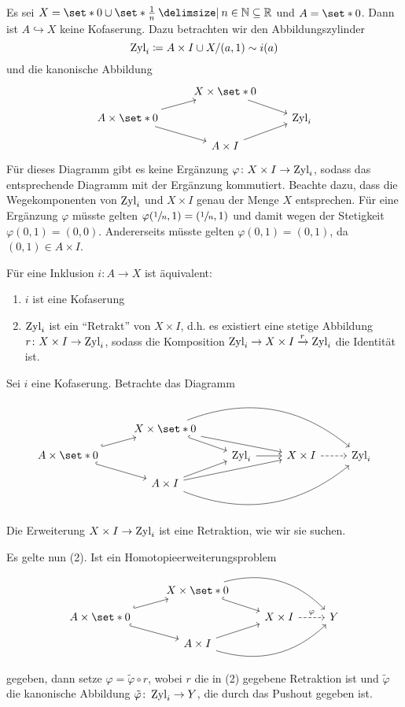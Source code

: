 \begin{beispiel}
	Es sei $X = \set*{0} \cup \set*{\frac{1}{n} \given n \in \mathbb{N}} \subseteq \mathbb{R}$ und $A = \set*{0}$.
	Dann ist $A \hookrightarrow X$ keine Kofaserung.
	Dazu betrachten wir den Abbildungszylinder 
	\[
		\operatorname{Zyl}_i \coloneqq A \times I \cup X / (a,1) \sim i(a)
	\]
	und die kanonische Abbildung
	\[
		\begin{tikzcd}[row sep=small]
			& X \times \set*{0}   \drar \\
			A \times \set*{0} \urar \drar& & \Zyl_i  \\
			& A \times I \urar
		\end{tikzcd}
	\]
	Für dieses Diagramm gibt es keine Ergänzung $\varphi \colon X \times I \to \operatorname{Zyl}_i$, sodass das entsprechende Diagramm mit der Ergänzung kommutiert.
	Beachte dazu, dass die Wegekomponenten von $\operatorname{Zyl}_i$ und $X \times I$ genau der Menge $X$ entsprechen.
	Für eine Ergänzung $\varphi$ müsste gelten $\varphi(\sfrac{1}{n},1) = (\sfrac{1}{n},1)$ und damit wegen der Stetigkeit $\varphi(0,1)=(0,0)$.
	Andererseits müsste gelten $\varphi(0,1) = (0,1)$, da $(0,1) \in A \times I$.
\end{beispiel}

\begin{satz}
	Für eine Inklusion $i \colon A \to X$ ist äquivalent:
	\begin{enumerate}[(1)]
		\item $i$ ist eine Kofaserung
		\item $\operatorname{Zyl}_i$ ist ein \enquote{Retrakt} von $X \times I$, d.h. es existiert eine stetige Abbildung $r \colon X \times I \to \operatorname{Zyl}_i$, sodass die Komposition $\operatorname{Zyl}_i \to X \times I \xrightarrow{r} \operatorname{Zyl}_i$ die Identität ist.
	\end{enumerate}
\end{satz}
\begin{beweis}
	Sei $i$ eine Kofaserung.
	Betrachte das Diagramm
	\[
		\begin{tikzcd}[row sep=small]
			& X \times \set*{0}  \drar[hook] \ar[rrd] \ar[rrrd,bend left] \\
			A \times \set*{0} \urar[hook] \drar[hook] & & \Zyl_i \rar & X \times I \rar[dashed] & \Zyl_i  \\
			& A \times I \urar \ar[urr] \ar[urrr,bend right]
		\end{tikzcd}
	\]
	Die Erweiterung $X \times I \to \operatorname{Zyl}_i$ ist eine Retraktion, wie wir sie suchen.
	
	Es gelte nun (2).
	Ist ein Homotopieerweiterungsproblem
	\[
		\begin{tikzcd}[row sep=small]
			& X \times \set*{0}  \drar[hook] \ar[rrd,bend left] \\
			A \times \set*{0} \urar[hook] \drar[hook] & & X \times I \rar[dashed,"\varphi"] & Y \\
			& A \times I \urar \ar[urr,bend right]
		\end{tikzcd}
	\]
	gegeben, dann setze $\varphi = \tilde{\varphi} \circ r$, wobei $r$ die in (2) gegebene Retraktion ist und $\tilde{\varphi}$ die kanonische Abbildung $\tilde{\varphi} \colon \operatorname{Zyl}_i \to Y$, die durch das Pushout gegeben ist.
\end{beweis}

